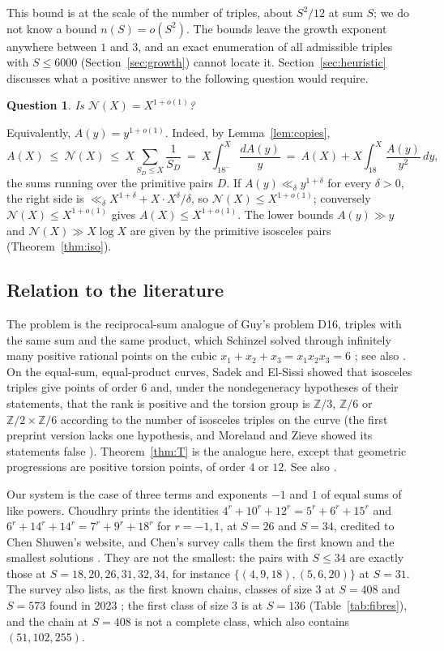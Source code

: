 \documentclass[11pt]{amsart}
\newtheorem{introquestion}[introthm]{Question}
\theoremstyle{definition}
\theoremstyle{remark}
\newcommand{\Z}{\mathbb{Z}}
\newcommand{\N}{\mathcal{N}}
\begin{document}
This bound is at the scale of the number of triples, about $S^2/12$ at sum $S$; we do not know a bound $n(S)=o(S^2)$. The bounds leave the growth exponent anywhere between $1$ and $3$, and an exact enumeration of all admissible triples with $S\le6000$ (Section~\ref{sec:growth}) cannot locate it. Section~\ref{sec:heuristic} discusses what a positive answer to the following question would require.

\begin{introquestion}\label{q:intro}
Is $\N(X)=X^{1+o(1)}$?
\end{introquestion}

Equivalently, $A(y)=y^{1+o(1)}$. Indeed, by Lemma~\ref{lem:copies},
\[
  A(X)\ \le\ \N(X)\ \le\ X\sum_{S_D\le X}\frac1{S_D}\ =\ X\int_{18^-}^X\frac{dA(y)}y\ =\ A(X)+X\int_{18}^X\frac{A(y)}{y^2}\,dy ,
\]
the sums running over the primitive pairs $D$. If $A(y)\ll_\delta y^{1+\delta}$ for every $\delta>0$, the right side is $\ll_\delta X^{1+\delta}+X\cdot X^\delta/\delta$, so $\N(X)\le X^{1+o(1)}$; conversely $\N(X)\le X^{1+o(1)}$ gives $A(X)\le X^{1+o(1)}$. The lower bounds $A(y)\gg y$ and $\N(X)\gg X\log X$ are given by the primitive isosceles pairs (Theorem~\ref{thm:iso}).

\subsection{Relation to the literature}
The problem is the reciprocal-sum analogue of Guy's problem D16, triples with the same sum and the same product, which Schinzel solved through infinitely many positive rational points on the cubic $x_1+x_2+x_3=x_1x_2x_3=6$ \cite{schinzel1996}; see also \cite{kelly1989,zhangcai2013,bremnerguy1997}. On the equal-sum, equal-product curves, Sadek and El-Sissi showed that isosceles triples give points of order $6$ \cite[Prop.~2.5]{sadekelsissi2015} and, under the nondegeneracy hypotheses of their statements, that the rank is positive and the torsion group is $\Z/3$, $\Z/6$ or $\Z/2\times\Z/6$ according to the number of isosceles triples on the curve \cite[Prop.~2.7, Thm~2.8]{sadekelsissi2015} (the first preprint version lacks one hypothesis, and Moreland and Zieve showed its statements false \cite{morelandzieve2013}). Theorem~\ref{thm:T} is the analogue here, except that geometric progressions are positive torsion points, of order $4$ or $12$. See also \cite{cha2019,ysv2024}.

Our system is the case of three terms and exponents $-1$ and $1$ of equal sums of like powers. Choudhry \cite[(3), p.~738]{choudhry2011} prints the identities $4^r+10^r+12^r=5^r+6^r+15^r$ and $6^r+14^r+14^r=7^r+9^r+18^r$ for $r=-1,1$, at $S=26$ and $S=34$, credited to Chen Shuwen's website, and Chen's survey calls them the first known and the smallest solutions \cite[Appendix~A.5.1, (A.650)--(A.651)]{chen2025}. They are not the smallest: the pairs with $S\le34$ are exactly those at $S=18,20,26,31,32,34$, for instance $\{(4,9,18),(5,6,20)\}$ at $S=31$. The survey also lists, as the first known chains, classes of size $3$ at $S=408$ and $S=573$ found in 2023 \cite[(A.652)--(A.655)]{chen2025}; the first class of size $3$ is at $S=136$ (Table~\ref{tab:fibres}), and the chain at $S=408$ is not a complete class, which also contains $(51,102,255)$.
\end{document}
